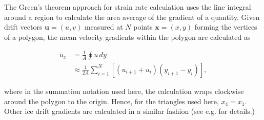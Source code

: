 \documentclass[review, jog]{igs}
\begin{document}
The Green's theorem approach for strain rate calculation uses the line integral around a region to calculate the area average of the gradient of a quantity.
Given drift vectors $\mathbf{u} = (u, v)$ measured at $N$ points $\mathbf{x} = (x, y)$ forming the vertices of a polygon, the mean velocity gradients within the polygon are calculated as
\begin{linenomath*}
\begin{align}
\overline{u}_x & = \frac 1A \oint u \, dy \nonumber\\ 
& \approx  \frac{1}{2A} \sum_{i=1}^N \left[(u_{i+1} + u_i)(y_{i+1} - y_i)\right],
\end{align}
\end{linenomath*}
where in the summation notation used here, the calculation wraps clockwise around the polygon to the origin. Hence, for the triangles used here, $x_4 = x_1$. Other ice drift gradients are calculated in a similar fashion (see e.g. \cite{lindsay2003_RADARSATGeophysical, Hutchings2018, bouchat2020_ReassessingQuality} for details.) 
\end{document}
